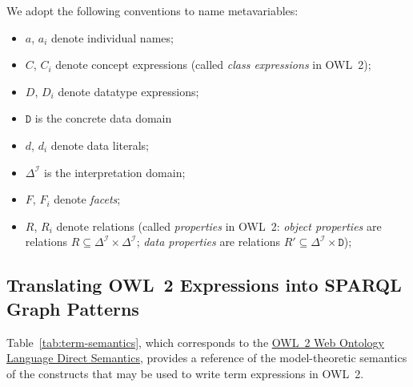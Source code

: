 \documentclass[a4paper]{article}
\newcounter{ex}
\begin{document}
We adopt the following conventions to name metavariables:
\begin{itemize}
\item $a$, $a_i$ denote individual names;
\item $C$, $C_i$ denote concept expressions (called \emph{class expressions} in OWL~2);
\item $D$, $D_i$ denote datatype expressions;
\item $\mathtt{D}$ is the concrete data domain
\item $d$, $d_i$ denote data literals;
\item $\Delta^\mathcal{I}$ is the interpretation domain;
\item $F$, $F_i$ denote \emph{facets};
\item $R$, $R_i$ denote relations (called \emph{properties} in OWL~2:
  \emph{object properties} are relations $R \subseteq \Delta^\mathcal{I} \times \Delta^\mathcal{I}$;
  \emph{data properties} are relations $R' \subseteq \Delta^\mathcal{I} \times \mathtt{D}$);
\end{itemize}

\subsection{Translating OWL~2 Expressions into SPARQL Graph Patterns}

Table~\ref{tab:term-semantics}, which corresponds to the
\href{http://www.w3.org/TR/2012/REC-owl2-direct-semantics-20121211/}{OWL~2 Web Ontology Language Direct Semantics},
provides a reference of the model-theoretic semantics
of the constructs that may be used to write term expressions in OWL~2.
\end{document}
